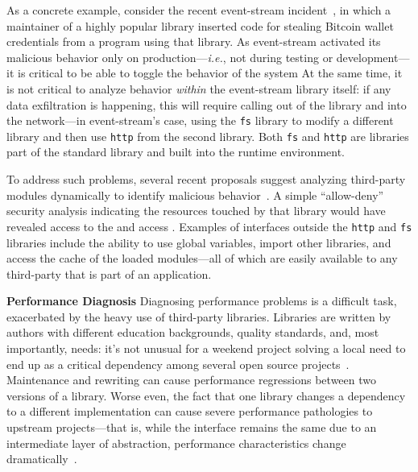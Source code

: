 \documentclass[letterpaper,twocolumn,10pt]{article}
\def\ie{{\em i.e.}, }
\newcommand{\heading}[1]{\vspace{2pt}\noindent\textbf{#1}\enspace}
\newcommand{\ttt}[1]{\texttt{#1}}
\newcommand{\fixme}[1]{{\color{red}#1}}
\begin{document}
As a concrete example, consider the recent event-stream incident~\cite{es1, es2}, in which a maintainer of a highly popular library inserted code for stealing Bitcoin wallet credentials from a program using that library.
As event-stream activated its malicious behavior only on production---\ie not during testing or development---it is critical to be able to toggle the behavior of the system
At the same time, it is not critical to analyze behavior \emph{within} the event-stream library itself:
  if any data exfiltration is happening, this will require calling out of the library and into the network---in event-stream's case, using the \ttt{fs} library to modify a different library and then use \ttt{http} from the second library.
Both \ttt{fs} and \ttt{http} are libraries part of the standard library and built into the runtime environment.

To address such problems, several recent proposals suggest analyzing third-party modules dynamically to identify malicious behavior~\cite{}.
A simple ``allow-deny'' security analysis indicating the resources touched by that library would have revealed access to the and access .
Examples of interfaces outside the \ttt{http} and \ttt{fs} libraries include the ability to use global variables, import other libraries, and access the cache of the loaded modules---all of which are easily available to any third-party that is part of an application.


\heading{Performance Diagnosis}
Diagnosing performance problems is a difficult task, exacerbated by the heavy use of third-party libraries.
Libraries are written by authors with different education backgrounds, quality standards, and, most importantly, needs:
  it's not unusual for a weekend project solving a local need to end up as a critical dependency among several open source projects~\cite{}.
Maintenance and rewriting can cause performance regressions between two versions of a library.
Worse even, the fact that one library changes a dependency to a different implementation can cause severe performance pathologies to upstream projects---that is, while the interface remains the same due to an intermediate layer of abstraction, performance characteristics change dramatically~\cite{evhaus}.
\end{document}

